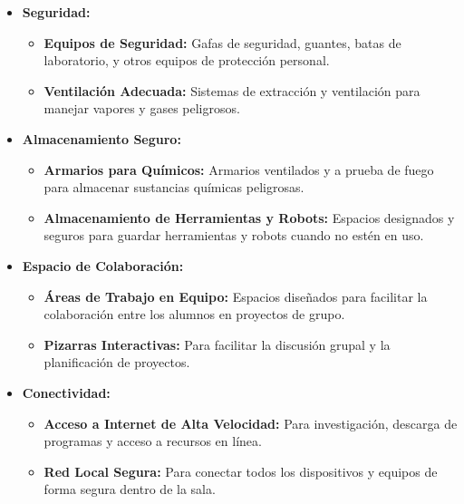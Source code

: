 \begin{itemize}
    \item \textbf{Seguridad:}
            \begin{itemize}
                \item \textbf{Equipos de Seguridad:} Gafas de seguridad, guantes, batas de laboratorio, y otros equipos de protección personal.
                \item \textbf{Ventilación Adecuada:} Sistemas de extracción y ventilación para manejar vapores y gases peligrosos.
            \end{itemize}
    \item \textbf{Almacenamiento Seguro:}
            \begin{itemize}
                \item \textbf{Armarios para Químicos:} Armarios ventilados y a prueba de fuego para almacenar sustancias químicas peligrosas.
                \item \textbf{Almacenamiento de Herramientas y Robots:} Espacios designados y seguros para guardar herramientas y robots cuando no estén en uso.
            \end{itemize}
    \item \textbf{Espacio de Colaboración:}
            \begin{itemize}
                \item \textbf{Áreas de Trabajo en Equipo:} Espacios diseñados para facilitar la colaboración entre los alumnos en proyectos de grupo.
                \item \textbf{Pizarras Interactivas:} Para facilitar la discusión grupal y la planificación de proyectos.
            \end{itemize}
    \item \textbf{Conectividad:}
            \begin{itemize}
                \item \textbf{Acceso a Internet de Alta Velocidad:} Para investigación, descarga de programas y acceso a recursos en línea.
                \item \textbf{Red Local Segura:} Para conectar todos los dispositivos y equipos de forma segura dentro de la sala.
            \end{itemize}
\end{itemize}




\newpage
